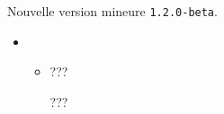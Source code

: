 Nouvelle version mineure \verb+1.2.0-beta+.

\begin{itemize}[itemsep=.5em]
    \item {}
    \begin{itemize}[itemsep=.5em]
        \item ???

              \smallskip

              ???
    \end{itemize}





\end{itemize}

\separation
